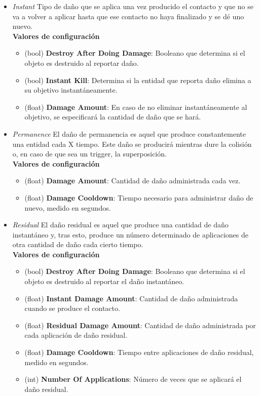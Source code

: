 \begin{itemize}
	\item \textit{Instant}
Tipo de daño que se aplica una vez producido el contacto y que no se va a volver a aplicar hasta que ese contacto no haya finalizado y se dé uno nuevo.\\

\textbf{Valores de configuración}
	\begin{itemize}
	        \item (bool) \textbf{Destroy After Doing Damage}: Booleano que determina si el objeto es destruido al reportar daño.
	        \item (bool) \textbf{Instant Kill}: Determina si la entidad que reporta daño elimina a su objetivo instantáneamente.
	        \item (float) \textbf{Damage Amount}: En caso de no eliminar instantáneamente al objetivo, se especificará la cantidad de daño que se hará.
	 \end{itemize}
	\item \textit{Permanence}
El daño de permanencia es aquel que produce constantemente una entidad cada X tiempo. Este daño se producirá mientras dure la colisión o, en caso de que sea un trigger, la superposición.\\

\textbf{Valores de configuración}
	\begin{itemize}
	        \item (float) \textbf{Damage Amount}: Cantidad de daño administrada cada vez.
	        \item (float) \textbf{Damage Cooldown}: Tiempo necesario para administrar daño de nuevo, medido en segundos.
	\end{itemize}

	\item \textit{Residual}
El daño residual es aquel que produce una cantidad de daño instantáneo y, tras esto, produce un número determinado de aplicaciones de otra cantidad de daño cada cierto tiempo.\\

\textbf{Valores de configuración}
	\begin{itemize}
	        \item (bool) \textbf{Destroy After Doing Damage}: Booleano que determina si el objeto es destruido al reportar el daño instantáneo.
	        \item (float) \textbf{Instant Damage Amount}: Cantidad de daño administrada cuando se produce el contacto.
	        \item (float) \textbf{Residual Damage Amount}: Cantidad de daño administrada por cada aplicación de daño residual.
	        \item (float) \textbf{Damage Cooldown}: Tiempo entre aplicaciones de daño residual, medido en segundos.
	        \item (int) \textbf{Number Of Applications}: Número de veces que se aplicará el daño residual.
	\end{itemize}
\end{itemize}


